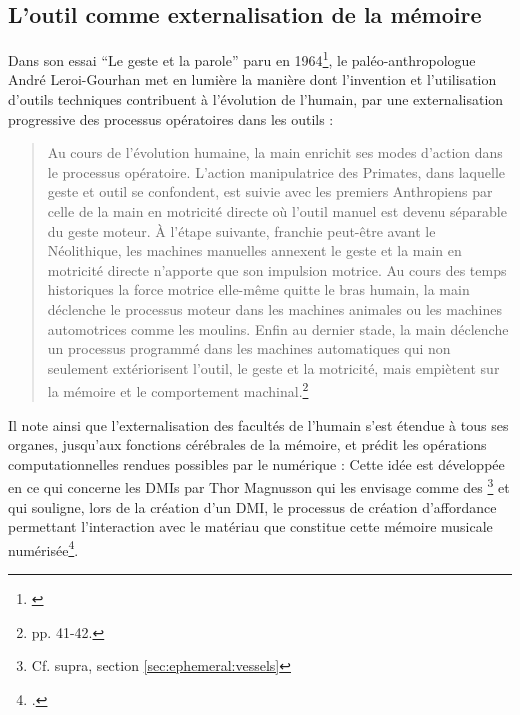 \subsection{L'outil comme externalisation de la mémoire}
\label{sec:gesture:instrumental_to_musical:externalisation}

\noindent Dans son essai ``Le geste et la parole'' paru en 1964\footnote{\cite{leroi-gourhan_geste_1964}}, le paléo-anthropologue André Leroi-Gourhan met en lumière la manière dont l'invention et l'utilisation d'outils techniques contribuent à l'évolution de l'humain, par une externalisation progressive des processus opératoires dans les outils :
\vspace{-1em}
\begin{quotation}
	Au cours de l’évolution humaine, la main enrichit ses modes d’action dans le processus opératoire. L’action manipulatrice des Primates, dans laquelle geste et outil se confondent, est suivie avec les premiers Anthropiens par celle de la main en motricité directe où l’outil manuel est devenu séparable du geste moteur. À l’étape suivante, franchie peut-être avant le Néolithique, les machines manuelles annexent le geste et la main en motricité directe n’apporte que son impulsion motrice. Au cours des temps historiques la force motrice elle-même quitte le bras humain, la main déclenche le processus moteur dans les machines animales ou les machines automotrices comme les moulins. Enfin au dernier stade, la main déclenche un processus programmé dans les machines automatiques qui non seulement extériorisent l’outil, le geste et la motricité, mais empiètent sur la mémoire et le comportement machinal.\footnote{\cite{leroi-gourhan_geste_1964} pp. 41-42.}
\end{quotation}
\indent Il note ainsi que l’externalisation des facultés de l'humain s’est étendue à tous ses organes, jusqu'aux fonctions cérébrales de la mémoire, et prédit les opérations computationnelles rendues possibles par le numérique :  Cette idée est développée en ce qui concerne les \glspl{DMI} par Thor Magnusson qui les envisage comme des \footnote{Cf. supra, section \ref{sec:ephemeral:vessels}} et qui souligne, lors de la création d'un \gls{DMI}, le processus de création d'affordance permettant l'interaction avec le matériau que constitue cette mémoire musicale numérisée\footnote{ \cite{magnusson_epistemic_2009}.}.

